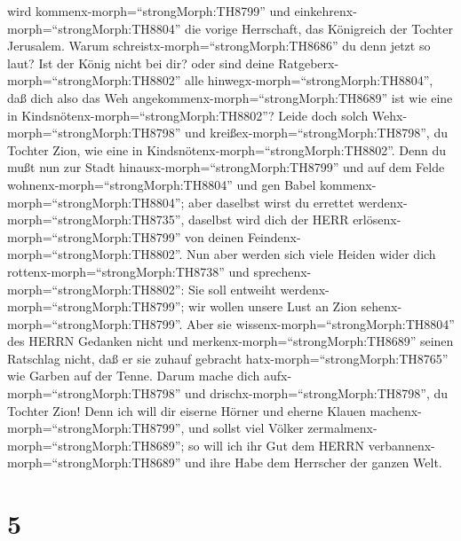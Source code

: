 wird kommenx-morph=``strongMorph:TH8799'' und
einkehrenx-morph=``strongMorph:TH8804'' die vorige Herrschaft, das
Königreich der Tochter Jerusalem.  Warum
schreistx-morph=``strongMorph:TH8686'' du denn jetzt so laut? Ist der
König nicht bei dir? oder sind deine
Ratgeberx-morph=``strongMorph:TH8802'' alle
hinwegx-morph=``strongMorph:TH8804'', daß dich also das Weh
angekommenx-morph=``strongMorph:TH8689'' ist wie eine in
Kindsnötenx-morph=``strongMorph:TH8802''?  Leide doch solch
Wehx-morph=``strongMorph:TH8798'' und
kreißex-morph=``strongMorph:TH8798'', du Tochter Zion, wie eine in
Kindsnötenx-morph=``strongMorph:TH8802''. Denn du mußt nun zur Stadt
hinausx-morph=``strongMorph:TH8799'' und auf dem Felde
wohnenx-morph=``strongMorph:TH8804'' und gen Babel
kommenx-morph=``strongMorph:TH8804''; aber daselbst wirst du errettet
werdenx-morph=``strongMorph:TH8735'', daselbst wird dich der HERR
erlösenx-morph=``strongMorph:TH8799'' von deinen
Feindenx-morph=``strongMorph:TH8802''.  Nun aber werden
sich viele Heiden wider dich rottenx-morph=``strongMorph:TH8738'' und
sprechenx-morph=``strongMorph:TH8802'': Sie soll entweiht
werdenx-morph=``strongMorph:TH8799''; wir wollen unsere Lust an Zion
sehenx-morph=``strongMorph:TH8799''.  Aber sie
wissenx-morph=``strongMorph:TH8804'' des HERRN Gedanken nicht und
merkenx-morph=``strongMorph:TH8689'' seinen Ratschlag nicht, daß er sie
zuhauf gebracht hatx-morph=``strongMorph:TH8765'' wie Garben auf der
Tenne.  Darum mache dich aufx-morph=``strongMorph:TH8798''
und drischx-morph=``strongMorph:TH8798'', du Tochter Zion! Denn ich will
dir eiserne Hörner und eherne Klauen
machenx-morph=``strongMorph:TH8799'', und sollst viel Völker
zermalmenx-morph=``strongMorph:TH8689''; so will ich ihr Gut dem HERRN
verbannenx-morph=``strongMorph:TH8689'' und ihre Habe dem Herrscher der
ganzen Welt.

\hypertarget{section-4}{%
\section{5}\label{section-4}}

